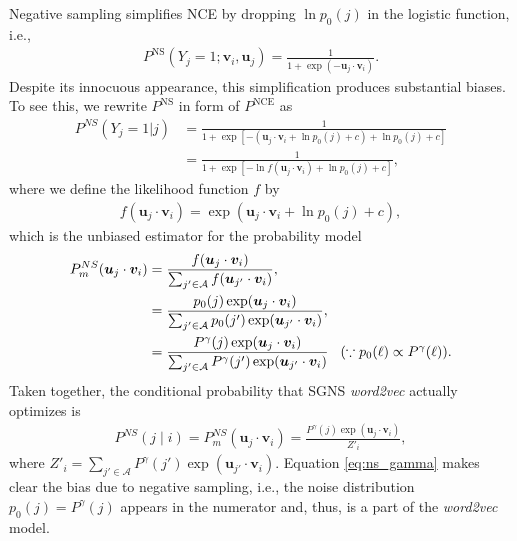 \documentclass[12pt]{article} %
\newcommand{\vect}[1]{\boldsymbol{#1}}
\def\given{\mid}
\begin{document}
Negative sampling simplifies NCE by dropping $ \ln p_0(j)$ in the logistic function, i.e.,
\begin{align}
	\label{eq:logistic-regress}
	P^{\text{NS}}(Y_{j} = 1; \vect{v}_{i}, \vect{u}_j) = \frac{1}{1 + \exp(-\vect{u}_j \cdot \vect{v}_{i})}.
\end{align}
Despite its innocuous appearance, this simplification produces substantial biases. 
To see this, we rewrite $P^{\text{NS}}$ in form of $P^{\text{NCE}}$ as 
\begin{align}
	P^{NS}\left(Y_{j}=1 \vert j\right) & = \frac{
		1
	}{
		1 + \exp\left[ - \left( \vect{u}_j \cdot \vect{v}_{i} + \ln p_0(j) + c \right) + \ln p_0(j) + c \right]
	}                                             \\
	                                   & = \frac{
		1
	}{
		1 + \exp\left[ - \ln f(\vect{u}_j \cdot \vect{v}_{i}) + \ln p_0(j) + c \right]
	},
\end{align}
where we define the likelihood function $f$ by
\begin{align}
	f(\vect{u}_j \cdot \vect{v}_{i}) = \exp\left( \vect{u}_j \cdot \vect{v}_{i} + \ln p_0(j) + c\right),
\end{align}
which is the unbiased estimator for the probability model
\begin{align}
	\label{eq:unbiasef}
	P_m^{NS}(\vect{u}_j \cdot \vect{v}_{i}) & = \frac{ f(\vect{u}_j \cdot \vect{v}_{i}) }{\sum_{ j' \in {\cal A}} f(\vect{u}_{j'} \cdot \vect{v}_{i}) },                                                                                               \\
	                                        & = \frac{  p_0(j)\exp( \vect{u}_j \cdot \vect{v}_{i} ) }{\sum_{j' \in \mathcal{A}}  p_0(j') \exp(\vect{u}_{j'} \cdot \vect{v}_{i})},                                                                      \\
	                                        & = \frac{  P^\gamma(j)\exp( \vect{u}_j \cdot \vect{v}_{i} ) }{\sum_{j' \in \mathcal{A}}  P^\gamma(j') \exp(\vect{u}_{j'} \cdot \vect{v}_{i})} \hspace{0.3cm}(\because p_0(\ell) \propto P^\gamma (\ell)).
\end{align}
Taken together, the conditional probability that SGNS \textit{word2vec} actually optimizes is
\begin{align}
\label{eq:ns_gamma}
	P^{NS}(j\given i) = P_m^{NS}(\vect{u}_j \cdot \vect{v}_{i})  =  \frac{  P^\gamma(j)\exp( \vect{u}_j \cdot \vect{v}_{i} ) }{Z'_i},
\end{align}
where $Z'_i=\sum_{j' \in \mathcal{A}}  P^\gamma(j') \exp(\vect{u}_{j'} \cdot \vect{v}_{i})$.
Equation \eqref{eq:ns_gamma}  makes clear the bias due to negative sampling, i.e., 
the noise distribution $p_0(j)=P^\gamma(j)$ appears in the numerator and, thus, is a part of the {\it word2vec} model.
\end{document}
